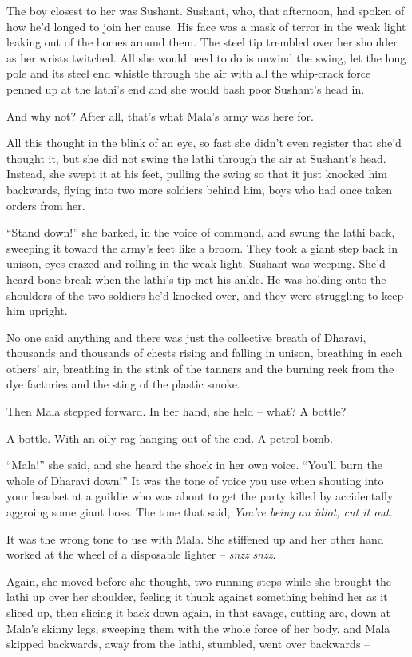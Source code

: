 The boy closest to her was Sushant. Sushant, who, that afternoon,
had spoken of how he'd longed to join her cause. His face was a
mask of terror in the weak light leaking out of the homes around
them. The steel tip trembled over her shoulder as her wrists
twitched. All she would need to do is unwind the swing, let the
long pole and its steel end whistle through the air with all the
whip-crack force penned up at the lathi's end and she would bash
poor Sushant's head in.

And why not? After all, that's what Mala's army was here for.

All this thought in the blink of an eye, so fast she didn't even
register that she'd thought it, but she did not swing the lathi
through the air at Sushant's head. Instead, she swept it at his
feet, pulling the swing so that it just knocked him backwards,
flying into two more soldiers behind him, boys who had once taken
orders from her.

``Stand down!'' she barked, in the voice of command, and swung the
lathi back, sweeping it toward the army's feet like a broom. They
took a giant step back in unison, eyes crazed and rolling in the
weak light. Sushant was weeping. She'd heard bone break when the
lathi's tip met his ankle. He was holding onto the shoulders of the
two soldiers he'd knocked over, and they were struggling to keep
him upright.

No one said anything and there was just the collective breath of
Dharavi, thousands and thousands of chests rising and falling in
unison, breathing in each others' air, breathing in the stink of
the tanners and the burning reek from the dye factories and the
sting of the plastic smoke.

Then Mala stepped forward. In her hand, she held -- what? A
bottle?

A bottle. With an oily rag hanging out of the end. A petrol bomb.

``Mala!'' she said, and she heard the shock in her own voice. ``You'll
burn the whole of Dharavi down!'' It was the tone of voice you use
when shouting into your headset at a guildie who was about to get
the party killed by accidentally aggroing some giant boss. The tone
that said, \emph{You're being an idiot, cut it out.}

It was the wrong tone to use with Mala. She stiffened up and her
other hand worked at the wheel of a disposable lighter --
\emph{snzz} \emph{snzz}.

Again, she moved before she thought, two running steps while she
brought the lathi up over her shoulder, feeling it thunk against
something behind her as it sliced up, then slicing it back down
again, in that savage, cutting arc, down at Mala's skinny legs,
sweeping them with the whole force of her body, and Mala skipped
backwards, away from the lathi, stumbled, went over backwards --

